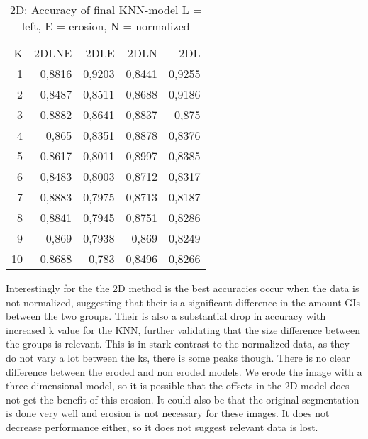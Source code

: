 \begin{table}[H]
  \centering
    \begin{tabular}{rrrrr}
    K     & 2DLNE & 2DLE  & 2DLN  & 2DL \\
    1     & 0,8816 & 0,9203 & 0,8441 & 0,9255 \\
    2     & 0,8487 & 0,8511 & 0,8688 & 0,9186 \\
    3     & 0,8882 & 0,8641 & 0,8837 & 0,875 \\
    4     & 0,865 & 0,8351 & 0,8878 & 0,8376 \\
    5     & 0,8617 & 0,8011 & 0,8997 & 0,8385 \\
    6     & 0,8483 & 0,8003 & 0,8712 & 0,8317 \\
    7     & 0,8883 & 0,7975 & 0,8713 & 0,8187 \\
    8     & 0,8841 & 0,7945 & 0,8751 & 0,8286 \\
    9     & 0,869 & 0,7938 & 0,869 & 0,8249 \\
    10    & 0,8688 & 0,783 & 0,8496 & 0,8266 \\
    \end{tabular}%
  \caption{2D: Accuracy of final KNN-model L = left, E = erosion, N = normalized}\label{tab:2DFinalModel}%
\end{table}%
Interestingly for the the 2D method is the best accuracies occur when the data is not normalized, suggesting that their is a significant difference in the amount GIs between the two groups. Their is also a substantial drop in accuracy with increased k value for the KNN, further validating that the size difference between the groups is relevant. This is in stark contrast to the normalized data, as they do not vary a lot between the ks, there is some peaks though.
There is no clear difference between the eroded and non eroded models. We erode the image with a three-dimensional model, so it is possible that the offsets in the 2D model does not get the benefit of this erosion. It could also be that the original segmentation is done very well and erosion is not necessary for these images. It does not decrease performance either, so it does not suggest relevant data is lost.

